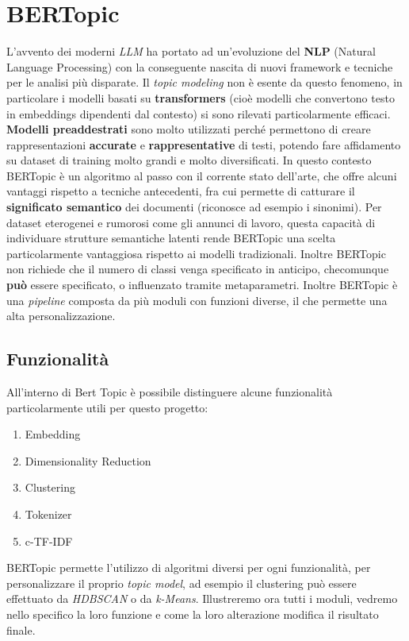 \chapter{BERTopic}
L'avvento dei moderni \emph{LLM} ha portato ad un'evoluzione del \textbf{NLP} (Natural Language Processing) con la conseguente nascita di nuovi framework e tecniche per le analisi più disparate.
Il \emph{topic modeling} non è esente da questo fenomeno, in particolare i modelli basati su \textbf{transformers} (cioè modelli che convertono testo in embeddings dipendenti dal contesto) si sono rilevati particolarmente efficaci.%
\textbf{Modelli preaddestrati} sono molto utilizzati perché permettono di creare rappresentazioni \textbf{accurate} e \textbf{rappresentative} di testi, potendo fare affidamento su dataset di training molto grandi e molto diversificati.
In questo contesto BERTopic è un algoritmo al passo con il corrente stato dell'arte, che offre alcuni vantaggi rispetto a tecniche antecedenti, fra cui permette di catturare il \textbf{significato semantico} dei documenti (riconosce ad esempio i sinonimi). Per dataset eterogenei e rumorosi come gli annunci di lavoro, questa capacità di individuare strutture semantiche latenti rende BERTopic una scelta particolarmente vantaggiosa rispetto ai modelli tradizionali. Inoltre BERTopic non richiede che il numero di classi venga specificato in anticipo, checomunque \textbf{può} essere specificato, o influenzato tramite metaparametri.
Inoltre BERTopic è una \emph{pipeline} composta da più moduli con funzioni diverse, il che permette una alta personalizzazione.

\section{Funzionalità}
All'interno di Bert Topic è possibile distinguere alcune funzionalità particolarmente utili per questo progetto:
\begin{enumerate}
\item Embedding
\item Dimensionality Reduction
\item Clustering
\item Tokenizer
\item c-TF-IDF
\end{enumerate}

BERTopic permette l'utilizzo di algoritmi diversi per ogni funzionalità, per personalizzare il proprio \emph{topic model}, ad esempio il clustering può essere effettuato da \emph{HDBSCAN} o da \emph{k-Means}.
Illustreremo ora tutti i moduli, vedremo nello specifico la loro funzione e come la loro alterazione modifica il risultato finale.
